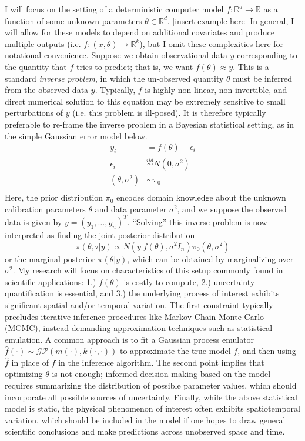 \documentclass[12pt]{article}
\newcommand{\R}{\mathcal{R}}
\def\R{\mathbb{R}}
\begin{document}
I will focus on the setting of a deterministic computer model $f: \R^d \to \R$ as a function of some unknown parameters $\theta \in \R^d$. [insert example here] In general, I will allow
for these models to depend on additional covariates and produce multiple outputs (i.e. $f: (x, \theta) \to \R^k$), but I omit these complexities here for notational convenience. Suppose 
we obtain observational data $y$ corresponding to the quantity that $f$ tries to predict; that is, we want $f(\theta) \approx y$. This is a standard \textit{inverse problem}, in which
the un-observed quantity $\theta$ must be inferred from the observed data $y$. Typically, $f$ is highly non-linear, non-invertible, and direct numerical solution to this equation may be extremely sensitive
to small perturbations of $y$ (i.e. this problem is ill-posed). It is therefore typically preferable to re-frame the inverse problem in a Bayesian statistical setting, as in the simple Gaussian error model below. 
\begin{align*}
y_i &= f(\theta) + \epsilon_i \\
\epsilon_i &\overset{iid}{\sim} N(0, \sigma^2) \\
(\theta, \sigma^2) &\sim \pi_0 \\
\end{align*}
Here, the prior distribution $\pi_0$ encodes domain knowledge about the unknown calibration parameters $\theta$ and data parameter $\sigma^2$, and we suppose the observed data is given by 
$y = (y_1, \dots, y_n)^T$. ``Solving'' this inverse problem is now interpreted as finding the joint posterior distribution
\[\pi(\theta, \tau|y) \propto N(y|f(\theta), \sigma^2 I_n)\pi_0(\theta, \sigma^2)\]
or the marginal posterior $\pi(\theta|y)$, which can be obtained by marginalizing over $\sigma^2$. My research will focus on characteristics of this setup commonly found in scientific applications: 1.) $f(\theta)$ is
costly to compute, 2.) uncertainty quantification is essential, and 3.) the underlying process of interest exhibits significant spatial and/or temporal variation. The first constraint typically precludes iterative inference 
procedures like Markov Chain Monte Carlo (MCMC), instead demanding approximation techniques such as statistical emulation. A common approach is to fit a Gaussian process emulator 
$\hat{f}(\cdot) \sim \mathcal{GP}(m(\cdot), k(\cdot, \cdot))$ to approximate the true model $f$, and then using $\hat{f}$ in place of $f$ in the inference algorithm. The second point implies that optimizing $\theta$ is not enough; informed  decision-making based on the model requires summarizing the distribution of possible parameter values, which should incorporate all possible sources of uncertainty. Finally, while the above statistical model is static, the physical phenomenon of interest often exhibits spatiotemporal variation, which should be included in the model if one hopes to draw general scientific conclusions and make predictions 
across unobserved space and time. \\
\end{document}
